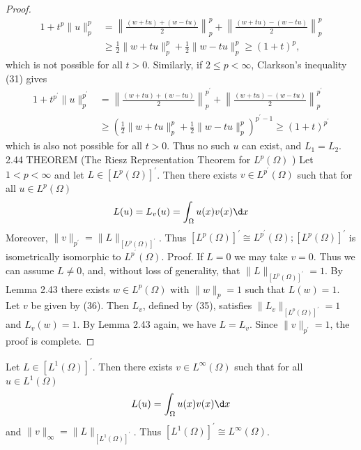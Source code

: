 \begin{proof}
  \[
  \begin{aligned}
  1+t^p\|u\|_p^p & =\left\|\frac{(w+t u)+(w-t u)}{2}\right\|_p^p+\left\|\frac{(w+t u)-(w-t u)}{2}\right\|_p^p \\
  & \geq \frac{1}{2}\|w+t u\|_p^p+\frac{1}{2}\|w-t u\|_p^p \geq(1+t)^p,
  \end{aligned}
  \]
  which is not possible for all $t>0$. Similarly, if $2 \leq p<\infty$,
  Clarkson's inequality (31) gives
  \[
  \begin{aligned}
  1+t^{p^{\prime}}\|u\|_p^{p^{\prime}} & =\left\|\frac{(w+t u)+(w-t u)}{2}\right\|_p^{p^{\prime}}+\left\|\frac{(w+t u)-(w-t u)}{2}\right\|_p^{p^{\prime}} \\
  & \geq\left(\frac{1}{2}\|w+t u\|_p^p+\frac{1}{2}\|w-t u\|_p^p\right)^{p^{\prime}-1} \geq(1+t)^{p^{\prime}}
  \end{aligned}
  \]
  which is also not possible for all $t>0$. Thus no such $u$ can exist, and $L_1=L_2$.
  2.44 THEOREM (The Riesz Representation Theorem for $L^p(\Omega)$ ) Let $1<p<\infty$ and let $L \in\left[L^p(\Omega)\right]^{\prime}$. Then there exists $v \in L^{p^{\prime}}(\Omega)$ such that for all $u \in L^p(\Omega)$
  \[
  L(u)=L_v(u)=\int_{\Omega} u(x) v(x) \d x
  \]
  Moreover, $\|v\|_{p^{\prime}}=\|L\|_{\left[L^p(\Omega)\right]^{\prime}}$. Thus $\left[L^p(\Omega)\right]^{\prime} \cong L^{p^{\prime}}(\Omega) ;\left[L^p(\Omega)\right]^{\prime}$ is isometrically isomorphic to $L^{p^{\prime}}(\Omega)$.
  Proof. If $L=0$ we may take $v=0$. Thus we can assume $L \neq 0$, and, without loss of generality, that $\|L\|_{\left[L^p(\Omega)\right]^{\prime}}=1$. By Lemma 2.43 there exists $w \in L^p(\Omega)$ with $\|w\|_p=1$ such that $L(w)=1$. Let $v$ be given by (36). Then $L_v$, defined by (35), satisfies $\|L_v\|_{\left[L^p(\Omega)\right]^{\prime}}=1$ and $L_v(w)=1$. By Lemma 2.43 again, we have $L=L_v$. Since $\|v\|_{p^{\prime}}=1$, the proof is complete.
\end{proof}


\begin{theorem}
  Let $L \in\left[L^1(\Omega)\right]^{\prime}$. Then there exists $v \in L^{\infty}(\Omega)$ such that for all $u \in L^1(\Omega)$
  \[
  L(u)=\int_{\Omega} u(x) v(x) \d x
  \]
  and $\|v\|_{\infty}=\|L\|_{\left[L^1(\Omega)\right]^{\prime}}$. Thus $\left[L^1(\Omega)\right]^{\prime} \cong L^{\infty}(\Omega)$.
\end{theorem}

